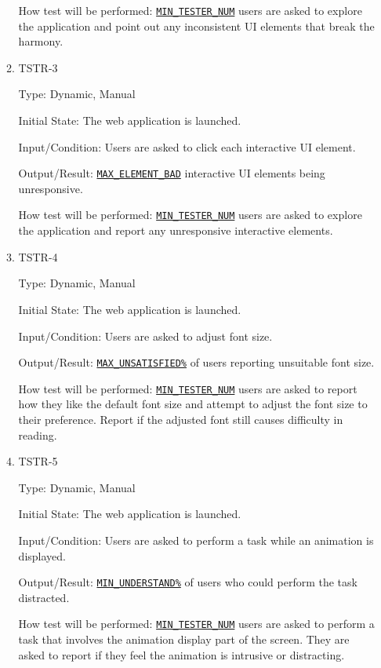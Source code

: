 \documentclass[12pt, titlepage]{article}
\begin{document}
\begin{enumerate}
\begin{enumerate}
How test will be performed: \hyperref[MIN_TESTER_NUM]{\texttt{MIN\_TESTER\_NUM}} users are asked to explore the application and point out any inconsistent UI elements that break the harmony.

\item{TSTR-3\\}\label{TSTR-3}

Type: Dynamic, Manual
					
Initial State: The web application is launched.
					
Input/Condition: Users are asked to click each interactive UI element.
					
Output/Result: \hyperref[MAX_ELEMENT_BAD]{\texttt{MAX\_ELEMENT\_BAD}} interactive UI elements being unresponsive.
					
How test will be performed: \hyperref[MIN_TESTER_NUM]{\texttt{MIN\_TESTER\_NUM}} users are asked to explore the application and report any unresponsive interactive elements.

\item{TSTR-4\\}\label{TSTR-4}

Type: Dynamic, Manual
					
Initial State: The web application is launched.
					
Input/Condition: Users are asked to adjust font size.
					
Output/Result: \hyperref[MAX_UNSATISFIED]{\texttt{MAX\_UNSATISFIED\%}} of users reporting unsuitable font size.
					
How test will be performed: \hyperref[MIN_TESTER_NUM]{\texttt{MIN\_TESTER\_NUM}} users are asked to report how they like the default font size and attempt to adjust the font size to their preference. Report if the adjusted font still causes difficulty in reading.

\item{TSTR-5\\}\label{TSTR-5}

Type: Dynamic, Manual
					
Initial State: The web application is launched.
					
Input/Condition: Users are asked to perform a task while an animation is displayed.
					
Output/Result: \hyperref[MIN_UNDERSTAND]{\texttt{MIN\_UNDERSTAND\%}} of users who could perform the task distracted.
					
How test will be performed: \hyperref[MIN_TESTER_NUM]{\texttt{MIN\_TESTER\_NUM}} users are asked to perform a task that involves the animation display part of the screen.  They are asked to report if they feel the animation is intrusive or distracting.
\end{enumerate}


\end{enumerate}
\end{document}
